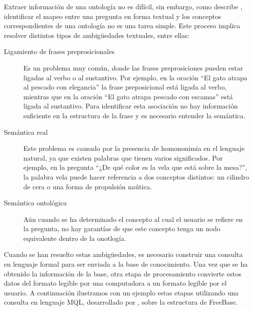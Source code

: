 Extraer información de una ontología no es difícil, sin embargo, como describe \citet{ungerQALD}, identificar el mapeo entre una pregunta en forma textual y los conceptos correspondientes de una ontología no es una tarea simple. Este proceso implica resolver distintos tipos de ambigüedades textuales, entre ellas:
\begin{description}
    \item[Ligamiento de frases preprosicionales] Es un problema muy común, donde las frases preprosiciones pueden estar ligadas al verbo o al sustantivo. Por ejemplo, en la oración ``El gato atrapa al pescado con elegancia'' la frase preposicional está ligada al verbo, mientras que en la oración ``El gato atrapa pescado con escamas'' está ligada al sustantivo. Para identificar esta asociación no hay información suficiente en la estructura de la frase y es necesario entender la semántica.
    \item[Semántica real] Este problema es causado por la presencia de homononimia en el lenguaje natural, ya que existen palabras que tienen varios significados. Por ejemplo, en la pregunta ``¿De qué color es la vela que está sobre la mesa?'', la palabra vela puede hacer referencia a dos conceptos distintos: un cilindro de cera o una forma de propulsión naútica.
    \item[Semántica ontológica] Aún cuando se ha determinado el concepto al cual el usuario se refiere en la pregunta, no hay garantías de que este concepto tenga un nodo equivalente dentro de la onotlogía.
\end{description}

Cuando se han resuelto estas ambigüedades, es necesario construir una consulta en lenguaje formal para ser enviada a la base de conocimiento. Una vez que se ha obtenido la información de la base, otra etapa de procesamiento convierte estos datos del formato legible por una computadora a un formato legible por el usuario. A continuación ilustramos con un ejemplo estas etapas utilizando una consulta en lenguaje MQL, desarrollado por \citet{mql}, sobre la estructura de FreeBase.


